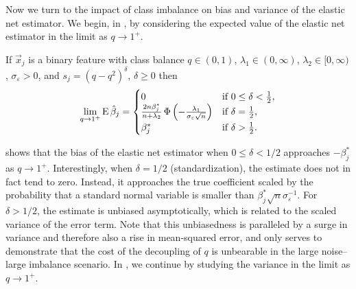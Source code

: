 Now we turn to the impact of class imbalance on bias and variance of the elastic net estimator. We begin, in , by considering the expected value of the elastic net estimator in the limit as \(q \rightarrow 1^+\).

\begin{theorem}
  \label{thm:classbalance-bias}
  If \(\vec{x}_j\) is a binary feature with class balance \(q \in (0, 1)\), \(\lambda_1 \in (0,\infty)\), \(\lambda_2 \in [0,\infty)\), \(\sigma_\varepsilon > 0\), and \(s_j = (q - q^2)^{\delta}\), \(\delta \geq 0\)  then
  \[
    \lim_{q \rightarrow 1^+} \operatorname{E} \hat{\beta}_j =
    \begin{cases}
      0                                                                                                  & \text{if } 0 \leq \delta < \frac{1}{2}, \\
      \frac{2n \beta_j^*}{n + \lambda_2} \operatorname{\Phi}\left(-\frac{\lambda_1}{\sigma_\varepsilon \sqrt{n}}\right) & \text{if } \delta = \frac{1}{2},        \\
      \beta^*_j                                                                                          & \text{if } \delta > \frac{1}{2}.
    \end{cases}
  \]
\end{theorem}


 shows that the bias of the elastic net estimator when \(0 \leq \delta < 1/2\) approaches
\(-\beta_j^*\) as \(q \rightarrow 1^+\). Interestingly, when \(\delta = 1/2\) (standardization), the estimate does not in fact tend to zero. Instead, it approaches the
true coefficient scaled by the probability that a standard normal variable is smaller than \(\beta_j^*\sqrt{n}\sigma_\varepsilon^{-1}\). For \(\delta > 1/2\), the
estimate is unbiased asymptotically, which is related to the scaled variance of the error term. Note that this unbiasedness is paralleled by a surge in variance and therefore also a rise in mean-squared error, and only serves to demonstrate that the cost of the decoupling of \(q\) is unbearable in the large noise--large imbalance scenario.
In , we continue by studying the variance in the limit as \(q \rightarrow 1^+\).

